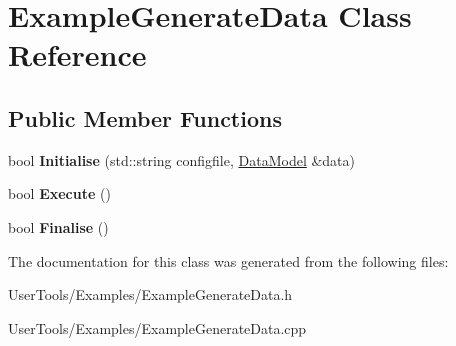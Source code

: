\hypertarget{classExampleGenerateData}{
\section{ExampleGenerateData Class Reference}
\label{classExampleGenerateData}
}
\subsection*{Public Member Functions}
\begin{DoxyCompactItemize}
\item 
\hypertarget{classExampleGenerateData_a34ef11ea9d2fe02c76c13227855538c7}{
bool {\bfseries Initialise} (std::string configfile, \hyperlink{classDataModel}{DataModel} \&data)}
\label{classExampleGenerateData_a34ef11ea9d2fe02c76c13227855538c7}

\item 
\hypertarget{classExampleGenerateData_a8ad50d91b736d2f11f48db3179ac7019}{
bool {\bfseries Execute} ()}
\label{classExampleGenerateData_a8ad50d91b736d2f11f48db3179ac7019}

\item 
\hypertarget{classExampleGenerateData_a7d27959b6641603076134866022f5ee9}{
bool {\bfseries Finalise} ()}
\label{classExampleGenerateData_a7d27959b6641603076134866022f5ee9}

\end{DoxyCompactItemize}


The documentation for this class was generated from the following files:\begin{DoxyCompactItemize}
\item 
UserTools/Examples/ExampleGenerateData.h\item 
UserTools/Examples/ExampleGenerateData.cpp\end{DoxyCompactItemize}
